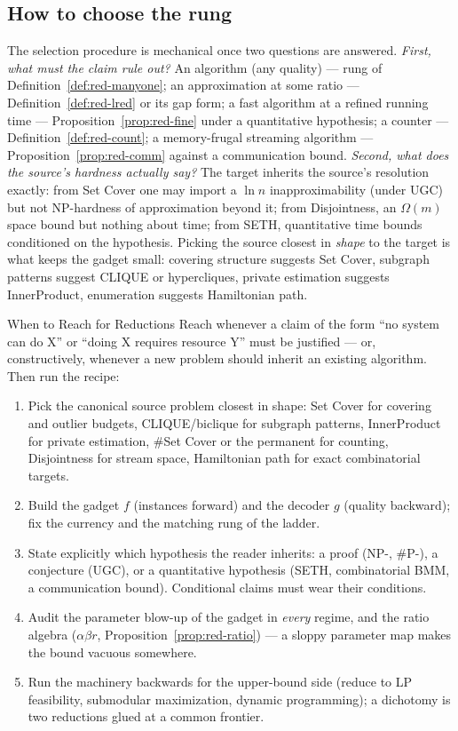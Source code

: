 \subsection{How to choose the rung}
\label{sec:red-choose}

The selection procedure is mechanical once two questions are answered. \emph{First,
what must the claim rule out?} An algorithm (any quality) --- rung of
Definition~\ref{def:red-manyone}; an approximation at some ratio ---
Definition~\ref{def:red-lred} or its gap form; a fast algorithm at a refined running
time --- Proposition~\ref{prop:red-fine} under a quantitative hypothesis; a counter ---
Definition~\ref{def:red-count}; a memory-frugal streaming algorithm ---
Proposition~\ref{prop:red-comm} against a communication bound. \emph{Second, what does
the source's hardness actually say?} The target inherits the source's resolution
exactly: from Set Cover one may import a $\ln n$ inapproximability (under UGC) but not
NP-hardness of approximation beyond it; from Disjointness, an $\Omega(m)$ space bound
but nothing about time; from SETH, quantitative time bounds conditioned on the
hypothesis. Picking the source closest in \emph{shape} to the target is what keeps the
gadget small: covering structure suggests Set Cover, subgraph patterns suggest CLIQUE
or hypercliques, private estimation suggests InnerProduct, enumeration suggests
Hamiltonian path.

\begin{reachbox}{When to Reach for Reductions}
Reach whenever a claim of the form ``no system can do X'' or ``doing X requires
resource Y'' must be justified --- or, constructively, whenever a new problem should
inherit an existing algorithm. Then run the recipe:
\begin{enumerate}
\item Pick the canonical source problem closest in shape: Set Cover for covering and
  outlier budgets, CLIQUE/biclique for subgraph patterns, InnerProduct for private
  estimation, \#Set Cover or the permanent for counting, Disjointness for stream space,
  Hamiltonian path for exact combinatorial targets.
\item Build the gadget $f$ (instances forward) and the decoder $g$ (quality backward);
  fix the currency and the matching rung of the ladder.
\item State explicitly which hypothesis the reader inherits: a proof (NP-, \#P-), a
  conjecture (UGC), or a quantitative hypothesis (SETH, combinatorial BMM, a
  communication bound). Conditional claims must wear their conditions.
\item Audit the parameter blow-up of the gadget in \emph{every} regime, and the ratio
  algebra ($\alpha\beta r$, Proposition~\ref{prop:red-ratio}) --- a sloppy parameter
  map makes the bound vacuous somewhere.
\item Run the machinery backwards for the upper-bound side (reduce to LP feasibility,
  submodular maximization, dynamic programming); a dichotomy is two reductions glued
  at a common frontier.
\end{enumerate}
\end{reachbox}

